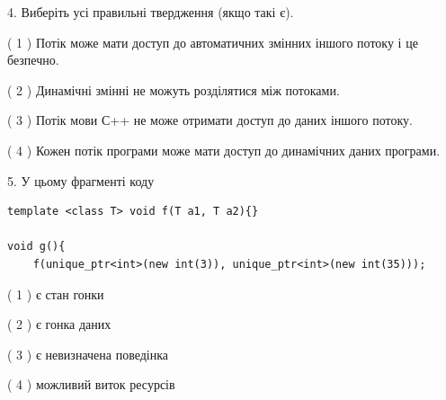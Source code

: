 \documentclass[12pt, ukrainian]{article}
\begin{document}
\begin {large}
{%
4. Виберіть усі правильні твердження (якщо такі є).\par
\vspace{2mm}

( 1 ) Потік може мати доступ до автоматичних змінних іншого потоку і це безпечно.%

( 2 ) Динамічні змінні не можуть розділятися між потоками.%

( 3 ) Потік мови С++ не може отримати доступ до даних іншого потоку.%

( 4 ) Кожен потік програми може мати доступ до динамічних даних програми.%


5. У цьому фрагменті коду
\begin{verbatim}
template <class T> void f(T a1, T a2){}

void g(){
    f(unique_ptr<int>(new int(3)), unique_ptr<int>(new int(35)));
\end{verbatim}

( 1 ) є стан гонки%

( 2 ) є гонка даних%

( 3 ) є невизначена поведінка%

( 4 ) можливий виток ресурсів%
}
\end {large}
\end{document}
